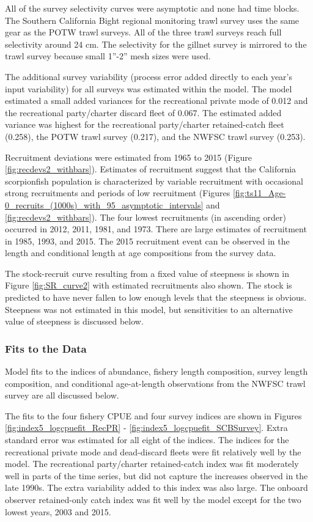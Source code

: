 \documentclass[12pt,]{article}
\begin{document}
All of the survey selectivity curves were asymptotic and none had time
blocks. The Southern California Bight regional monitoring trawl survey
uses the same gear as the POTW trawl surveys. All of the three trawl
surveys reach full selectivity around 24 cm. The selectivity for the
gillnet survey is mirrored to the trawl survey because small 1''-2''
mesh sizes were used.

The additional survey variability (process error added directly to each
year's input variability) for all surveys was estimated within the
model. The model estimated a small added variances for the recreational
private mode of 0.012 and the recreational party/charter discard fleet
of 0.067. The estimated added variance was highest for the recreational
party/charter retained-catch fleet (0.258), the POTW trawl survey
(0.217), and the NWFSC trawl survey (0.253).

Recruitment deviations were estimated from 1965 to 2015 (Figure
\ref{fig:recdevs2_withbars}). Estimates of recruitment suggest that the
California scorpionfish population is characterized by variable
recruitment with occasional strong recruitments and periods of low
recruitment (Figures
\ref{fig:ts11_Age-0_recruits_(1000s)_with_95_asymptotic_intervals} and
\ref{fig:recdevs2_withbars}). The four lowest recruitments (in ascending
order) occurred in 2012, 2011, 1981, and 1973. There are large estimates
of recruitment in 1985, 1993, and 2015. The 2015 recruitment event can
be observed in the length and conditional length at age compositions
from the survey data.

The stock-recruit curve resulting from a fixed value of steepness is
shown in Figure \ref{fig:SR_curve2} with estimated recruitments also
shown. The stock is predicted to have never fallen to low enough levels
that the steepness is obvious. Steepness was not estimated in this
model, but sensitivities to an alternative value of steepness is
discussed below.

\subsubsection{Fits to the Data}\label{fits-to-the-data}

Model fits to the indices of abundance, fishery length composition,
survey length composition, and conditional age-at-length observations
from the NWFSC trawl survey are all discussed below.

The fits to the four fishery CPUE and four survey indices are shown in
Figures \ref{fig:index5_logcpuefit_RecPR} -
\ref{fig:index5_logcpuefit_SCBSurvey}. Extra standard error was
estimated for all eight of the indices. The indices for the recreational
private mode and dead-discard fleets were fit relatively well by the
model. The recreational party/charter retained-catch index was fit
moderately well in parts of the time series, but did not capture the
increases observed in the late 1990s. The extra variability added to
this index was also large. The onboard observer retained-only catch
index was fit well by the model except for the two lowest years, 2003
and 2015.
\end{document}
